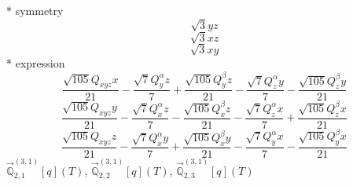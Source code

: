 \documentclass[fleqn,8pt]{jsarticle}
\begin{document}
\noindent\quad ** symmetry
\begin{dmath*}
\sqrt{3} y z
\end{dmath*}
\begin{dmath*}
\sqrt{3} x z
\end{dmath*}
\begin{dmath*}
\sqrt{3} x y
\end{dmath*}
\noindent\quad ** expression
\begin{dmath*}
\frac{\sqrt{105} Q_{xyz} x}{21} - \frac{\sqrt{7} Q_{y}^{\alpha} z}{7} + \frac{\sqrt{105} Q_{y}^{\beta} z}{21} - \frac{\sqrt{7} Q_{z}^{\alpha} y}{7} - \frac{\sqrt{105} Q_{z}^{\beta} y}{21}
\end{dmath*}
\begin{dmath*}
\frac{\sqrt{105} Q_{xyz} y}{21} - \frac{\sqrt{7} Q_{x}^{\alpha} z}{7} - \frac{\sqrt{105} Q_{x}^{\beta} z}{21} - \frac{\sqrt{7} Q_{z}^{\alpha} x}{7} + \frac{\sqrt{105} Q_{z}^{\beta} x}{21}
\end{dmath*}
\begin{dmath*}
\frac{\sqrt{105} Q_{xyz} z}{21} - \frac{\sqrt{7} Q_{x}^{\alpha} y}{7} + \frac{\sqrt{105} Q_{x}^{\beta} y}{21} - \frac{\sqrt{7} Q_{y}^{\alpha} x}{7} - \frac{\sqrt{105} Q_{y}^{\beta} x}{21}
\end{dmath*}
\noindent\quad $\vec{\mathbb{Q}}_{2,1}^{(3,1)}[q](T)$, $\vec{\mathbb{Q}}_{2,2}^{(3,1)}[q](T)$, $\vec{\mathbb{Q}}_{2,3}^{(3,1)}[q](T)$
\end{document}
